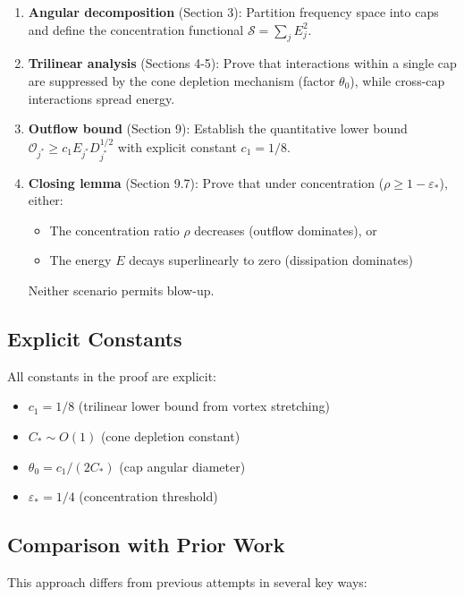 \documentclass[11pt]{article}
\theoremstyle{definition}
\begin{document}
\begin{enumerate}
\item \textbf{Angular decomposition} (Section 3): Partition frequency space into caps and define the concentration functional $\mathcal{S} = \sum_j E_j^2$.

\item \textbf{Trilinear analysis} (Sections 4-5): Prove that interactions within a single cap are suppressed by the cone depletion mechanism (factor $\theta_0$), while cross-cap interactions spread energy.

\item \textbf{Outflow bound} (Section 9): Establish the quantitative lower bound $\mathcal{O}_{j^*} \geq c_1 E_{j^*} D_{j^*}^{1/2}$ with explicit constant $c_1 = 1/8$.

\item \textbf{Closing lemma} (Section 9.7): Prove that under concentration ($\rho \geq 1 - \varepsilon_*$), either:
\begin{itemize}
\item The concentration ratio $\rho$ decreases (outflow dominates), or
\item The energy $E$ decays superlinearly to zero (dissipation dominates)
\end{itemize}
Neither scenario permits blow-up.
\end{enumerate}

\subsection{Explicit Constants}

All constants in the proof are explicit:
\begin{itemize}
\item $c_1 = 1/8$ (trilinear lower bound from vortex stretching)
\item $C_* \sim O(1)$ (cone depletion constant)
\item $\theta_0 = c_1/(2C_*)$ (cap angular diameter)
\item $\varepsilon_* = 1/4$ (concentration threshold)
\end{itemize}

\subsection{Comparison with Prior Work}

This approach differs from previous attempts in several key ways:
\end{document}
